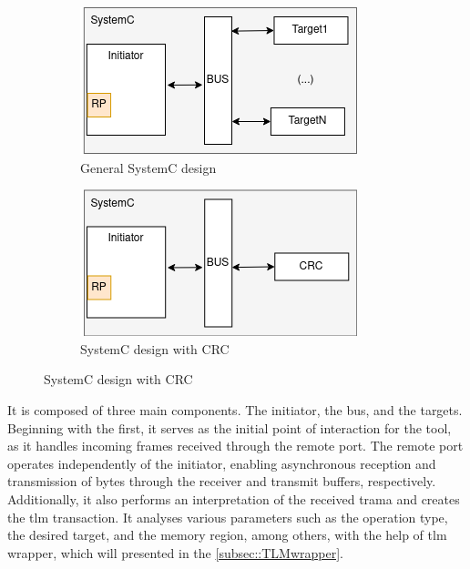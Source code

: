 \begin{figure}[H]
	\centering
	\begin{subfigure}{0.45\textwidth}
		\includegraphics[width=\textwidth]{Images/SystemCdesign.png}
 		\caption{General SystemC design}
	 	\label{fig_SystemCdesign_geral}
	\end{subfigure}
	\hfill
	\begin{subfigure}{0.45\textwidth}
		\centering
		\includegraphics[width=\textwidth]{Images/SystemCdesign_CRC.png}
		\caption{SystemC design with CRC}
		\label{fig_SystemCdesign_CRC}
	\end{subfigure}
		
	\label{fig:SystemCsdesign}
\end{figure}


It is composed of three main components. The initiator, the bus, and the targets. Beginning with the first, it serves as the initial 
point of interaction for the tool, as it handles incoming frames received through the remote port. The remote port operates independently 
of the initiator, enabling asynchronous reception and transmission of bytes through the receiver and transmit buffers, respectively.
Additionally, it also performs an interpretation of the received trama and creates the \gls{tlm} transaction. It analyses various 
parameters such as the operation type, the desired target, and the memory region, among others, with the help of \gls{tlm} wrapper, 
which will presented in the \autoref{subsec::TLMwrapper}.

